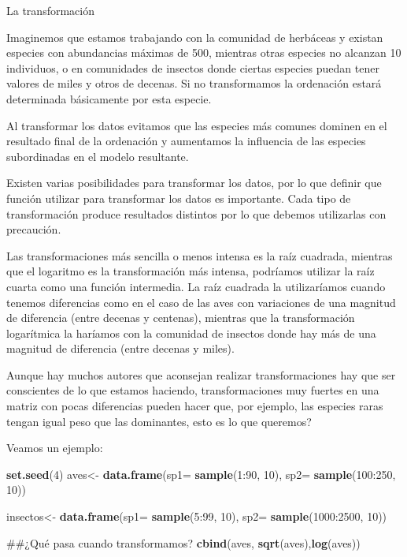 \documentclass[]{book}
\newenvironment{Shaded}{\begin{snugshade}}{\end{snugshade}}
\newcommand{\KeywordTok}[1]{\textcolor[rgb]{0.13,0.29,0.53}{\textbf{{#1}}}}
\newcommand{\DataTypeTok}[1]{\textcolor[rgb]{0.13,0.29,0.53}{{#1}}}
\newcommand{\DecValTok}[1]{\textcolor[rgb]{0.00,0.00,0.81}{{#1}}}
\newcommand{\StringTok}[1]{\textcolor[rgb]{0.31,0.60,0.02}{{#1}}}
\newcommand{\NormalTok}[1]{{#1}}
\begin{document}
La transformación

Imaginemos que estamos trabajando con la comunidad de herbáceas y
existan especies con abundancias máximas de 500, mientras otras especies
no alcanzan 10 individuos, o en comunidades de insectos donde ciertas
especies puedan tener valores de miles y otros de decenas. Si no
transformamos la ordenación estará determinada básicamente por esta
especie.

Al transformar los datos evitamos que las especies más comunes dominen
en el resultado final de la ordenación y aumentamos la influencia de las
especies subordinadas en el modelo resultante.

Existen varias posibilidades para transformar los datos, por lo que
definir que función utilizar para transformar los datos es importante.
Cada tipo de transformación produce resultados distintos por lo que
debemos utilizarlas con precaución.

Las transformaciones más sencilla o menos intensa es la raíz cuadrada,
mientras que el logaritmo es la transformación más intensa, podríamos
utilizar la raíz cuarta como una función intermedia. La raíz cuadrada la
utilizaríamos cuando tenemos diferencias como en el caso de las aves con
variaciones de una magnitud de diferencia (entre decenas y centenas),
mientras que la transformación logarítmica la haríamos con la comunidad
de insectos donde hay más de una magnitud de diferencia (entre decenas y
miles).

Aunque hay muchos autores que aconsejan realizar transformaciones hay
que ser conscientes de lo que estamos haciendo, transformaciones muy
fuertes en una matriz con pocas diferencias pueden hacer que, por
ejemplo, las especies raras tengan igual peso que las dominantes, esto
es lo que queremos?

Veamos un ejemplo:

\begin{Shaded}
\begin{Highlighting}[]
\KeywordTok{set.seed}\NormalTok{(}\DecValTok{4}\NormalTok{)}
\NormalTok{aves<-}\StringTok{ }\KeywordTok{data.frame}\NormalTok{(}\DataTypeTok{sp1=} \KeywordTok{sample}\NormalTok{(}\DecValTok{1}\NormalTok{:}\DecValTok{90}\NormalTok{, }\DecValTok{10}\NormalTok{), }\DataTypeTok{sp2=} \KeywordTok{sample}\NormalTok{(}\DecValTok{100}\NormalTok{:}\DecValTok{250}\NormalTok{, }\DecValTok{10}\NormalTok{))}

\NormalTok{insectos<-}\StringTok{ }\KeywordTok{data.frame}\NormalTok{(}\DataTypeTok{sp1=} \KeywordTok{sample}\NormalTok{(}\DecValTok{5}\NormalTok{:}\DecValTok{99}\NormalTok{, }\DecValTok{10}\NormalTok{), }\DataTypeTok{sp2=} \KeywordTok{sample}\NormalTok{(}\DecValTok{1000}\NormalTok{:}\DecValTok{2500}\NormalTok{, }\DecValTok{10}\NormalTok{))}

\NormalTok{##¿Qué pasa cuando transformamos?}
\KeywordTok{cbind}\NormalTok{(aves, }\KeywordTok{sqrt}\NormalTok{(aves),}\KeywordTok{log}\NormalTok{(aves))}
\end{Highlighting}
\end{Shaded}
\end{document}
